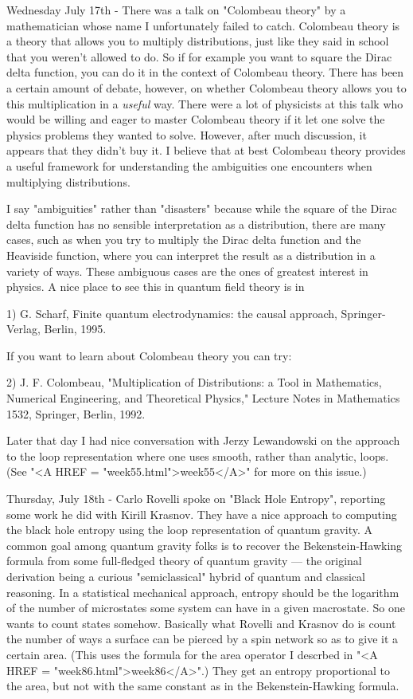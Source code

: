 Wednesday July 17th - There was a talk on "Colombeau theory" by a
mathematician whose name I unfortunately failed to catch.  Colombeau
theory is a theory that allows you to multiply distributions, just
like they said in school that you weren't allowed to do.  So if for
example you want to square the Dirac delta function, you can do it in
the context of Colombeau theory.  There has been a certain amount of
debate, however, on whether Colombeau theory allows you to this
multiplication in a \emph{useful} way.  There were a lot of physicists at
this talk who would be willing and eager to master Colombeau theory if
it let one solve the physics problems they wanted to solve.  However,
after much discussion, it appears that they didn't buy it.  I believe
that at best Colombeau theory provides a useful framework for
understanding the ambiguities one encounters when multiplying
distributions.

I say "ambiguities" rather than "disasters" because while the square
of the Dirac delta function has no sensible interpretation as a
distribution, there are many cases, such as when you try to multiply
the Dirac delta function and the Heaviside function, where you can
interpret the result as a distribution in a variety of ways.  These
ambiguous cases are the ones of greatest interest in physics.  A nice
place to see this in quantum field theory is in

1) G. Scharf, Finite quantum electrodynamics: the causal approach, 
Springer-Verlag, Berlin, 1995.  

If you want to learn about Colombeau theory you can try:

2) J. F. Colombeau, "Multiplication of Distributions: a Tool in
Mathematics, Numerical Engineering, and Theoretical Physics," Lecture
Notes in Mathematics 1532, Springer, Berlin, 1992.

Later that day I had nice conversation with Jerzy Lewandowski
on the approach to the loop representation where one uses smooth,
rather than analytic, loops.  (See "<A HREF = "week55.html">week55</A>" for more on this issue.)

Thursday, July 18th - Carlo Rovelli spoke on "Black Hole Entropy",
reporting some work he did with Kirill Krasnov.  They have a nice
approach to computing the black hole entropy using the loop
representation of quantum gravity.  A common goal among quantum
gravity folks is to recover the Bekenstein-Hawking formula from some
full-fledged theory of quantum gravity --- the original derivation
being a curious "semiclassical" hybrid of quantum and classical
reasoning.  In a statistical mechanical approach, entropy should be
the logarithm of the number of microstates some system can have in a
given macrostate.  So one wants to count states somehow.  Basically
what Rovelli and Krasnov do is count the number of ways a surface can
be pierced by a spin network so as to give it a certain area.  (This
uses the formula for the area operator I descrbed in "<A HREF = "week86.html">week86</A>".)  They
get an entropy proportional to the area, but not with the same constant
as in the Bekenstein-Hawking formula. 

